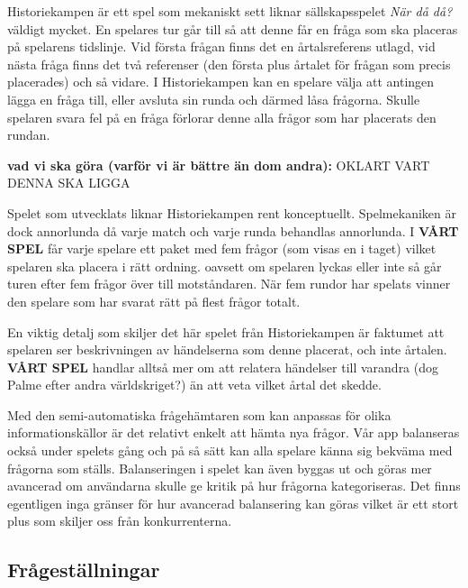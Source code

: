 \documentclass[12pt,a4paper]{article}
\begin{document}
Historiekampen är ett spel som mekaniskt sett liknar sällskapsspelet \textit{När då då?} väldigt mycket. En spelares tur går till så att denne får en fråga som ska placeras på spelarens tidslinje. Vid första frågan finns det en årtalsreferens utlagd, vid nästa fråga finns det två referenser (den första plus årtalet för frågan som precis placerades) och så vidare. I Historiekampen kan en spelare välja att antingen lägga en fråga till, eller avsluta sin runda och därmed låsa frågorna. Skulle spelaren svara fel på en fråga förlorar denne alla frågor som har placerats den rundan.

\textbf{vad vi ska göra (varför vi är bättre än dom andra):} 
OKLART VART DENNA SKA LIGGA

Spelet som utvecklats liknar Historiekampen rent konceptuellt. Spelmekaniken är dock annorlunda då varje match och varje runda behandlas annorlunda. I \textbf{VÅRT SPEL} får varje spelare ett paket med fem frågor (som visas en i taget) vilket spelaren ska placera i rätt ordning. oavsett om spelaren lyckas eller inte så går turen efter fem frågor över till motståndaren. När fem rundor har spelats vinner den spelare som har svarat rätt på flest frågor totalt. 

En viktig detalj som skiljer det här spelet från Historiekampen är faktumet att spelaren ser beskrivningen av händelserna som denne placerat, och inte årtalen. \textbf{VÅRT SPEL} handlar alltså mer om att relatera händelser till varandra (dog Palme efter andra världskriget?) än att veta vilket årtal det skedde.

Med den semi-automatiska frågehämtaren som kan anpassas för olika informationskällor är det relativt enkelt att hämta nya frågor. Vår app balanseras också under spelets gång och på så sätt kan alla spelare känna sig bekväma med frågorna som ställs. Balanseringen i spelet kan även byggas ut och göras mer avancerad om användarna skulle ge kritik på hur frågorna kategoriseras. Det finns egentligen inga gränser för hur avancerad balansering kan göras vilket är ett stort plus som skiljer oss från konkurrenterna.

\subsection{Frågeställningar}
\end{document}
